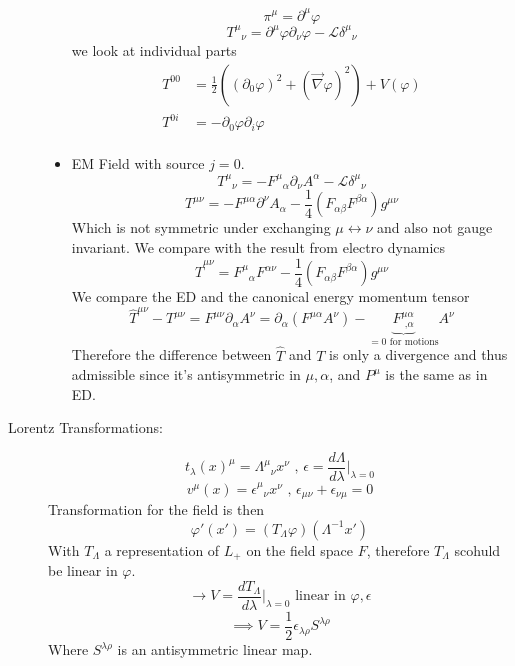 \documentclass{report}
\begin{document}
\begin{description}
\begin{itemize}
\[    \pi^{\mu} =  \partial^{\mu} \varphi 
    \] \[
    T^{\mu} _{\text{ }\nu} = \partial^{\mu} \varphi \partial_\nu \varphi - \mathcal{L} \delta^{\mu}_{\text{ }\nu}   
    \] we look at individual parts
    \begin{align*}
        T^{00} &= \frac{1}{2} \left( \left( \partial_0 \varphi \right) ^2 + \left( \vec{\nabla } \varphi \right) ^2 \right) + V\left( \varphi \right)   \\
        T^{0i} &= - \partial_0\varphi \partial_i \varphi   \\
    \end{align*}
  \item EM Field with source $j = 0$. \[
  T^{\mu}_{\text{ }\nu} = -F^{\mu}_{\text{ }\alpha} \partial_\nu A^{\alpha} - \mathcal{L} \delta^{\mu}_{\text{ }\nu}  
  \] \[
  T^{\mu \nu} = - F^{\mu \alpha} \partial^{\nu} A_\alpha - \frac{1}{4} \left( F_{\alpha \beta} F^{\beta \alpha}  \right) g^{\mu\nu}  
  \] Which is not symmetric under exchanging $\mu \leftrightarrow \nu$ and also not gauge invariant. We compare with the result from electro dynamics \[
  \hat{T}^{\mu\nu} = F^{\mu}_{\text{ }\alpha} F^{\alpha \nu} - \frac{1}{4} \left( F_{\alpha \beta} F^{\beta \alpha}  \right) g^{\mu\nu} 
  \] We compare the ED and the canonical energy momentum tensor \[
  \hat{T}^{\mu\nu} - T^{\mu\nu} = F^{\mu\nu} \partial_\alpha A^{\nu} = \partial_\alpha \left( F^{\mu \alpha} A^{\nu}  \right) - \underbrace{F^{\mu \alpha}_{\text{  ,}\alpha}}_{=0 \text{ for motions}}  A^{\nu}  
  \] Therefore the difference between $\hat{T}$ and $T$ is only a divergence and thus admissible since it's antisymmetric in $\mu, \alpha$, and $P^{\mu} $ is the same as in ED.
  \end{itemize}
\item[Lorentz Transformations:] \[
    t_\lambda( x )^{\mu} = \Lambda^{\mu}_{\text{ }\nu} x^{\nu} \text{  ,  } \epsilon = \frac{d\Lambda}{d\lambda}|_{\lambda = 0} 
\] \[
v^{\mu}\left( x \right) = \epsilon^{\mu}_{\text{ }\nu} x^{\nu}  \text{  ,  } \epsilon_{\mu\nu} + \epsilon_{\nu \mu} = 0
\] Transformation for the field is then \[
\varphi'\left( x' \right) = \left( T_\Lambda \varphi \right) \left( \Lambda^{-1} x' \right) 
\] With $T_\Lambda$ a representation of $L_+$ on the field space $F$, therefore $T_\Lambda$ scohuld be linear in $\varphi$.
\[
\to V = \frac{dT_\Lambda}{d\lambda}|_{\lambda = 0} \text{ linear in } \varphi, \epsilon 
\] \[
\implies V = \frac{1}{2} \epsilon_{\lambda \rho} S^{\lambda \rho} 
\] Where $S^{\lambda \rho} $ is an antisymmetric linear map.\\

\end{description}
\end{document}

